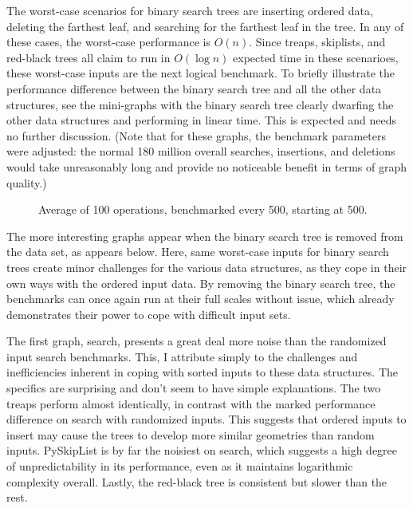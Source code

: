\documentclass{article}
\begin{document}
The worst-case scenarios for binary search trees are inserting ordered data, deleting the farthest leaf, and searching for the farthest leaf in the tree. In any of these cases, the worst-case performance is $O(n)$. Since treaps, skiplists, and red-black trees all claim to run in $O(\log n)$ expected time in these scenarioes, these worst-case inputs are the next logical benchmark. To briefly illustrate the performance difference between the binary search tree and all the other data structures, see the mini-graphs with the binary search tree clearly dwarfing the other data structures and performing in linear time. This is expected and needs no further discussion. (Note that for these graphs, the benchmark parameters were adjusted: the normal 180 million overall searches, insertions, and deletions would take unreasonably long and provide no noticeable benefit in terms of graph quality.)

\begin{figure}[h]
    \centering
    
    
    
    \caption{Average of 100 operations, benchmarked every 500, starting at 500.}
\end{figure}

The more interesting graphs appear when the binary search tree is removed from the data set, as appears below. Here, same worst-case inputs for binary search trees create minor challenges for the various data structures, as they cope in their own ways with the ordered input data. By removing the binary search tree, the benchmarks can once again run at their full scales without issue, which already demonstrates their power to cope with difficult input sets.



The first graph, search, presents a great deal more noise than the randomized input search benchmarks. This, I attribute simply to the challenges and inefficiencies inherent in coping with sorted inputs to these data structures. The specifics are surprising and don't seem to have simple explanations. The two treaps perform almost identically, in contrast with the marked performance difference on search with randomized inputs. This suggests that ordered inputs to insert may cause the trees to develop more similar geometries than random inputs. PySkipList is by far the noisiest on search, which suggests a high degree of unpredictability in its performance, even as it maintains logarithmic complexity overall. Lastly, the red-black tree is consistent but slower than the rest. 
\end{document}
